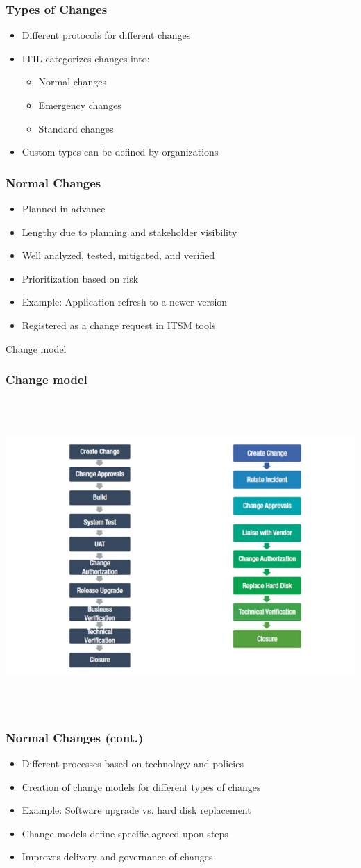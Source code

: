 \documentclass[aspectratio=169, table]{beamer}
\begin{document}
\begin{frame}
	\frametitle{Types of Changes}
	\begin{itemize}
		\item Different protocols for different changes
		\item ITIL categorizes changes into:
		\begin{itemize}
			\item Normal changes
			\item Emergency changes
			\item Standard changes
		\end{itemize}
		\item Custom types can be defined by organizations
	\end{itemize}
\end{frame}

\begin{frame}
	\frametitle{Normal Changes}
	\begin{itemize}
		\item Planned in advance
		\item Lengthy due to planning and stakeholder visibility
		\item Well analyzed, tested, mitigated, and verified
		\item Prioritization based on risk
		\item Example: Application refresh to a newer version
		\item Registered as a change request in ITSM tools
	\end{itemize}
\end{frame}

\begin{frame}{Change model} 	 \frametitle{Change model} \begin{center} 	\includegraphics[width=0.5\linewidth]{images/image-02.png} \end{center} \end{frame}

\begin{frame}
	\frametitle{Normal Changes (cont.)}
	\begin{itemize}
		\item Different processes based on technology and policies
		\item Creation of change models for different types of changes
		\item Example: Software upgrade vs. hard disk replacement
		\item Change models define specific agreed-upon steps
		\item Improves delivery and governance of changes
	\end{itemize}
\end{frame}
\end{document}
